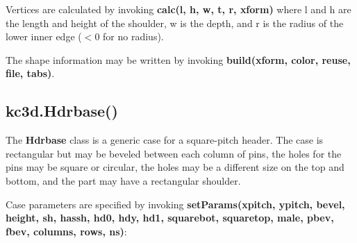 Vertices are calculated by invoking \textbf{calc(l, h, w, t, r, xform)} where l and h are the length
and height of the shoulder, w is the depth, and r is the radius of the lower inner edge ($<0$ for no radius).

The shape information may be written by invoking \textbf{build(xform, color, reuse, file, tabs)}.

\subsection{kc3d.Hdrbase()}
The \textbf{Hdrbase} class is a generic case for a square-pitch header. The case is rectangular but
may be beveled between each column of pins, the holes for the pins may be square or circular, the
holes may be a different size on the top and bottom, and the part may have a rectangular shoulder.

Case parameters are specified by invoking \textbf{setParams(xpitch, ypitch, bevel, height, sh, hassh, hd0,
hdy, hd1, squarebot, squaretop, male, pbev, fbev, columns, rows, ns)}:

